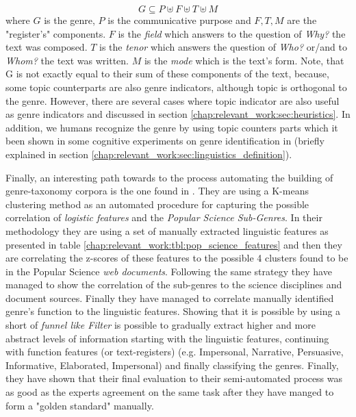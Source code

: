 {\begin{equation}\label{eq:genre_notion_in_math}
	G  \subseteq P \uplus F \uplus T \uplus M
\end{equation}
\noindent
where $G$ is the genre, $P$ is the communicative purpose and $F, T, M$ are the "register's" components. $F$ is the \textit{field} which answers to the question of \textit{Why?} the text was composed. $T$ is the \textit{tenor} which answers the question of \textit{Who?} or/and to \textit{Whom?} the text was written. $M$ is the \textit{mode} which is the text's form. Note, that G is not exactly equal to their sum of these components of the text, because, some topic counterparts are also genre indicators, although topic is orthogonal to the genre. However, there are several cases where topic indicator are also useful as genre indicators and discussed in section \ref{chap:relevant_work:sec:heuristics}. In addition, we humans recognize the genre by using topic counters parts which it been shown in some cognitive experiments on genre identification in \parencite{clark2014you, lieungnapar2017genre} (briefly explained in section \ref{chap:relevant_work:sec:linguistics_definition}).

Finally, an interesting path towards to the process automating the building of genre-taxonomy corpora is the one found in \parencite{lieungnapar2017genre}. They are using a K-means clustering method as an automated procedure for capturing the possible correlation of \textit{logistic features} and the \textit{Popular Science Sub-Genres}. In their methodology they are using a set of manually extracted linguistic features as presented in table \ref{chap:relevant_work:tbl:pop_science_features} and then they are correlating the z-scores of these features to the possible 4 clusters found to be in the Popular Science \textit{web documents}. Following the same strategy they have managed to show the correlation of the sub-genres to the science disciplines and document sources. Finally they have managed to correlate manually identified genre's function to the linguistic features. Showing that it is possible by using a short of \textit{funnel like Filter} is possible to gradually extract higher and more abstract levels of information starting with the linguistic features, continuing with function features (or text-registers) (e.g. Impersonal, Narrative, Persuasive, Informative, Elaborated, Impersonal) and finally classifying the genres. Finally, they have shown that their final evaluation to their semi-automated process was as good as the experts agreement on the same task after they have manged to form a "golden standard" manually. 


}
